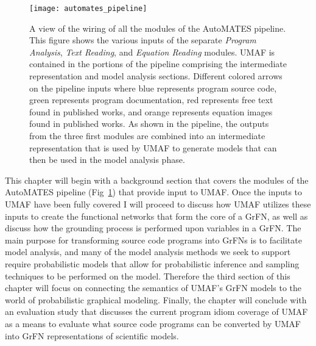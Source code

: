 \begin{figure}[!htbp]
    \label{automates_pipeline}
    \centering
    \texttt{[image: automates\_pipeline]}%
    \caption[The AutoMATES Pipeline]{A view of the wiring of all the modules of the AutoMATES pipeline. This figure shows the various inputs of the separate \textit{Program Analysis}, \textit{Text Reading}, and \textit{Equation Reading} modules. UMAF is contained in the portions of the pipeline comprising the intermediate representation and model analysis sections. Different colored arrows on the pipeline inputs where blue represents program source code, green represents program documentation, red represents free text found in published works, and orange represents equation images found in published works. As shown in the pipeline, the outputs from the three first modules are combined into an intermediate representation that is used by UMAF to generate models that can then be used in the model analysis phase.}
\end{figure}

This chapter will begin with a background section that covers the modules of the AutoMATES pipeline (Fig~\ref{automates_pipeline}) that provide input to UMAF.
Once the inputs to UMAF have been fully covered I will proceed to discuss how UMAF utilizes these inputs to create the functional networks that form the core of a GrFN, as well as discuss how the grounding process is performed upon variables in a GrFN.
The main purpose for transforming source code programs into GrFNs is to facilitate model analysis, and many of the model analysis methods we seek to support require probabilistic models that allow for probabilistic inference and sampling techniques to be performed on the model.
Therefore the third section of this chapter will focus on connecting the semantics of UMAF's GrFN models to the world of probabilistic graphical modeling.
Finally, the chapter will conclude with an evaluation study that discusses the current program idiom coverage of UMAF as a means to evaluate what source code programs can be converted by UMAF into GrFN representations of scientific models.

